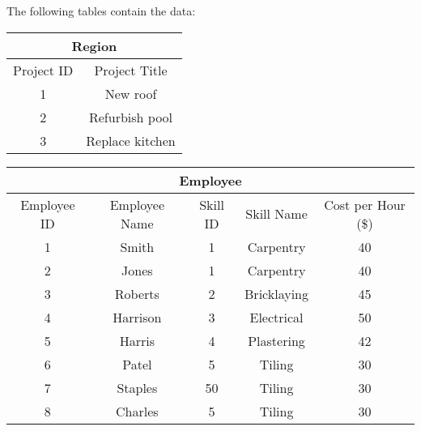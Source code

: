 The following tables contain the data:

\begin{tabular}{|c|c|}
\hline 
\multicolumn{2}{|c|}{Region}\tabularnewline
\hline 
Project ID & Project Title\tabularnewline
\hline 
1 & New roof\tabularnewline
\hline 
2 & Refurbish pool\tabularnewline
\hline 
3 & Replace kitchen\tabularnewline
\hline 
\end{tabular} %
\begin{tabular}{|c|c|c|c|c|}
\hline 
\multicolumn{5}{|c|}{Employee}\tabularnewline
\hline 
Employee ID & Employee Name & Skill ID & Skill Name & Cost per Hour (\$)\tabularnewline
\hline 
1 & Smith & 1 & Carpentry & 40\tabularnewline
\hline 
2 & Jones & 1 & Carpentry & 40\tabularnewline
\hline 
3 & Roberts & 2 & Bricklaying & 45\tabularnewline
\hline 
4 & Harrison & 3 & Electrical & 50\tabularnewline
\hline 
5 & Harris & 4 & Plastering & 42\tabularnewline
\hline 
6 & Patel & 5 & Tiling & 30\tabularnewline
\hline 
7 & Staples & 50 & Tiling & 30\tabularnewline
\hline 
8 & Charles & 5 & Tiling & 30\tabularnewline
\hline 
\end{tabular}

